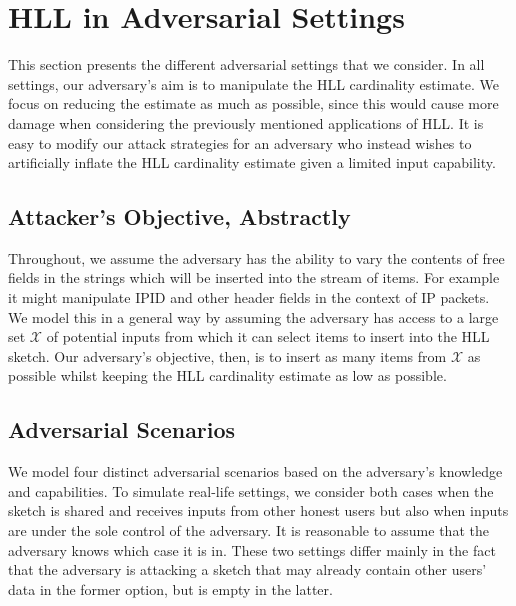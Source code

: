 \documentclass[sigconf, anonymous, dvipsnames]{acmart} %
\begin{document}
\section{HLL in Adversarial Settings}\label{sec:attacks}

This section presents the different adversarial settings that we consider. In all settings, our adversary's aim is to manipulate the HLL cardinality estimate. We focus on reducing the estimate as much as possible, since this would cause more damage when  considering the previously mentioned applications of HLL. It is easy to modify our attack strategies for an adversary who instead wishes to artificially inflate the HLL cardinality estimate given a limited input capability. 

\subsection{Attacker's Objective, Abstractly}
Throughout, we assume the adversary has the ability to vary the contents of free fields in the strings which will be inserted into the stream of items. For example it might manipulate IPID and other header fields in the context of IP packets. We model this in a general way by assuming the adversary has access to a large set ${\mathcal{X}}$ of potential inputs from which it can select items to insert into the HLL sketch. Our adversary's objective, then, is to insert as many items from ${\mathcal{X}}$ as possible whilst keeping the HLL cardinality estimate as low as possible.


\subsection{Adversarial Scenarios}\label{sec:set}
We model four distinct adversarial scenarios based on the adversary's knowledge and capabilities. To simulate real-life settings, we consider both cases when the sketch is shared and receives inputs from other honest users but also when inputs are under the sole control of the adversary.
It is reasonable to assume that the adversary knows which case it is in. 
These two settings differ mainly in the fact that the adversary is attacking a sketch that may already contain other users' data in the former option, but is empty in the latter.
\end{document}
